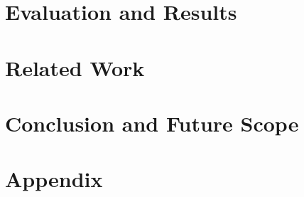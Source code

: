 \chapter{Evaluation and Results} \label{Evaluation and Results}


\chapter{Related Work} \label{Related work}


\chapter{Conclusion and Future Scope} \label{Conclusion and Future Scope}


\cleardoublepage
\printbibliography[heading=bibintoc]

\cleardoublepage
\pagestyle{headings}  %
\appendix


\renewcommand{\thechapter}{}        %
\chapter*{Appendix}

\renewcommand{\thechapter}{A}
\setcounter{chapter}{1}  %
\setcounter{section}{0}
\setcounter{figure}{0}

